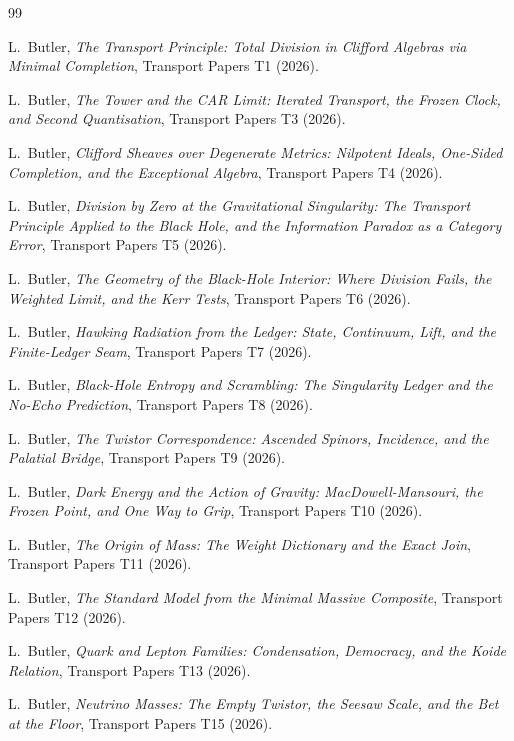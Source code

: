 \documentclass[11pt]{article}
\theoremstyle{definition}
\begin{document}
\begin{thebibliography}{99}

L.~Butler,
\emph{The Transport Principle: Total Division in Clifford Algebras via Minimal Completion},
Transport Papers T1 (2026).

L.~Butler,
\emph{The Tower and the CAR Limit: Iterated Transport, the Frozen Clock, and Second Quantisation},
Transport Papers T3 (2026).

L.~Butler,
\emph{Clifford Sheaves over Degenerate Metrics: Nilpotent Ideals, One-Sided Completion, and the Exceptional Algebra},
Transport Papers T4 (2026).

L.~Butler,
\emph{Division by Zero at the Gravitational Singularity: The Transport Principle Applied to the Black Hole, and the Information Paradox as a Category Error},
Transport Papers T5 (2026).

L.~Butler,
\emph{The Geometry of the Black-Hole Interior: Where Division Fails, the Weighted Limit, and the Kerr Tests},
Transport Papers T6 (2026).

L.~Butler,
\emph{Hawking Radiation from the Ledger: State, Continuum, Lift, and the Finite-Ledger Seam},
Transport Papers T7 (2026).

L.~Butler,
\emph{Black-Hole Entropy and Scrambling: The Singularity Ledger and the No-Echo Prediction},
Transport Papers T8 (2026).

L.~Butler,
\emph{The Twistor Correspondence: Ascended Spinors, Incidence, and the Palatial Bridge},
Transport Papers T9 (2026).

L.~Butler,
\emph{Dark Energy and the Action of Gravity: MacDowell-Mansouri, the Frozen Point, and One Way to Grip},
Transport Papers T10 (2026).

L.~Butler,
\emph{The Origin of Mass: The Weight Dictionary and the Exact Join},
Transport Papers T11 (2026).

L.~Butler,
\emph{The Standard Model from the Minimal Massive Composite},
Transport Papers T12 (2026).

L.~Butler,
\emph{Quark and Lepton Families: Condensation, Democracy, and the Koide Relation},
Transport Papers T13 (2026).

L.~Butler,
\emph{Neutrino Masses: The Empty Twistor, the Seesaw Scale, and the Bet at the Floor},
Transport Papers T15 (2026).


\end{thebibliography}
\end{document}

